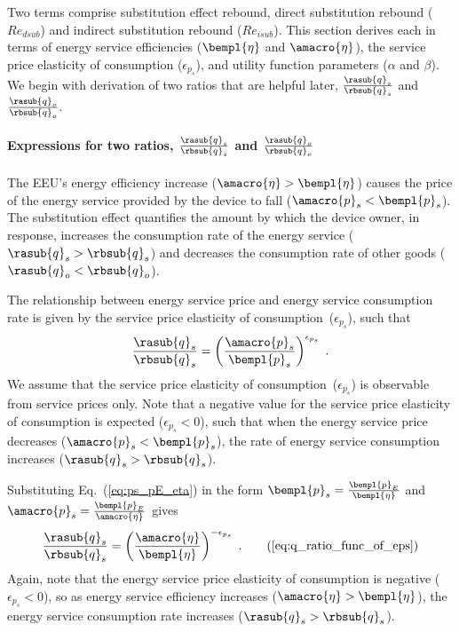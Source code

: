 \subsubsection{\Subeffect{}} 
\label{sec:Re_sub}

Two terms comprise substitution effect rebound,
direct substitution rebound ($Re_{dsub}$) and
indirect substitution rebound ($Re_{isub}$).
This section derives each in terms of energy service efficiencies ($\bempl{\eta}$ and $\amacro{\eta}$),
the service price elasticity of consumption ($\epsilon_{p_s}$), and
utility function parameters ($\alpha$ and $\beta$).
We begin with derivation of two ratios that are helpful later,
$\frac{\rasub{q}_s}{\rbsub{q}_s}$ and
$\frac{\rasub{q}_o}{\rbsub{q}_o}$.


\paragraph{Expressions for two ratios, $\frac{\rasub{q}_s}{\rbsub{q}_s}$ and $\frac{\rasub{q}_o}{\rbsub{q}_o}$}
\label{sec:two_ratios}

The EEU's energy efficiency increase
($\amacro{\eta} > \bempl{\eta}$)
causes the price of the energy service provided by the device to fall
($\amacro{p}_s < \bempl{p}_s$).
The substitution effect quantifies the amount by which
the device owner, in response,
increases the consumption rate of the energy service ($\rasub{q}_s > \rbsub{q}_s$) and
decreases the consumption rate of other goods ($\rasub{q}_o < \rbsub{q}_o$).

The relationship between energy service price and energy service consumption rate
is given by the service price elasticity of consumption~($\epsilon_{p_s}$),
such that
%
\begin{equation}
  \frac{\rasub{q}_s}{\rbsub{q}_s} = \left( \frac{\amacro{p}_s}{\bempl{p}_s} \right)^{\epsilon_{p_s}} \; .
\end{equation}
%
We assume that the service price elasticity of consumption~($\epsilon_{p_s}$) is observable
from service prices only.
Note that a negative value for the service price elasticity of consumption is expected ($\epsilon_{p_s} < 0$),
such that when the energy service price decreases ($\amacro{p}_s < \bempl{p}_s$),
the rate of energy service consumption increases ($\rasub{q}_s > \rbsub{q}_s$).

Substituting Eq.~(\ref{eq:ps_pE_eta}) in the form
$\bempl{p}_s = \frac{\bempl{p}_E}{\bempl{\eta}}$ and
$\amacro{p}_s = \frac{\bempl{p}_E}{\amacro{\eta}}$
gives
%
\begin{equation}
  \frac{\rasub{q}_s}{\rbsub{q}_s} = \left( \frac{\amacro{\eta}}{\bempl{\eta}} \right)^{-\epsilon_{p_s}} \; .
                                                                        \tag{\ref{eq:q_ratio_func_of_eps}}
\end{equation}
%
Again, note that the energy service price elasticity of consumption
is negative ($\epsilon_{p_s} < 0$), so
as energy service efficiency increases ($\amacro{\eta} > \bempl{\eta}$),
the energy service consumption rate increases ($\rasub{q}_s > \rbsub{q}_s$).

